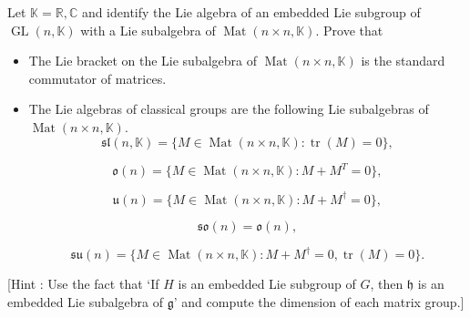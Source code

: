 \begin{exercise}\label{4}
    Let $\mathbb{K}=\mathbb{R},\mathbb{C}$ and identify the
    Lie algebra of an embedded Lie subgroup of $\operatorname{GL}(n,\mathbb{K})$
    with a Lie subalgebra of $\operatorname{Mat}(n\times n,\mathbb{K})$.
    Prove that
    \begin{itemize}
        \item The Lie bracket on the Lie subalgebra of 
            $\operatorname{Mat}(n\times n,\mathbb{K})$
            is the standard commutator of matrices.

        \item The Lie algebras of classical groups are the
            following Lie subalgebras of $\operatorname{Mat}(n\times n, \mathbb{K})$.
            \begin{equation*}
                \mathfrak{sl}(n,\mathbb{K})=
                \{
                    M\in \operatorname{Mat}(n\times n,\mathbb{K}):
                    \operatorname{tr}(M)=0
                \},
            \end{equation*}

            \begin{equation*}
                \mathfrak{o}(n)=
                \{
                    M\in \operatorname{Mat}(n\times n,\mathbb{K}):
                    M + M^T =0
                \},
            \end{equation*}

            \begin{equation*}
                \mathfrak{u}(n)=
                \{ 
                    M\in \operatorname{Mat}(n\times n,\mathbb{K}):
                    M + M^\dagger =0
                \},
            \end{equation*}

            \begin{equation*}
                \mathfrak{so}(n)=\mathfrak{o}(n),
            \end{equation*}

            \begin{equation*}
                \mathfrak{su}(n)=
                \{ 
                    M\in \operatorname{Mat}(n\times n,\mathbb{K}):
                    M + M^\dagger =0, \operatorname{tr}(M)=0
                \}.
            \end{equation*}
    \end{itemize}

    [Hint : Use the fact that `If $H$ is an embedded Lie subgroup of $G$,
    then $\mathfrak{h}$ is an embedded Lie subalgebra of $\mathfrak{g}$'
    and compute the dimension of each matrix group.]
\end{exercise}

